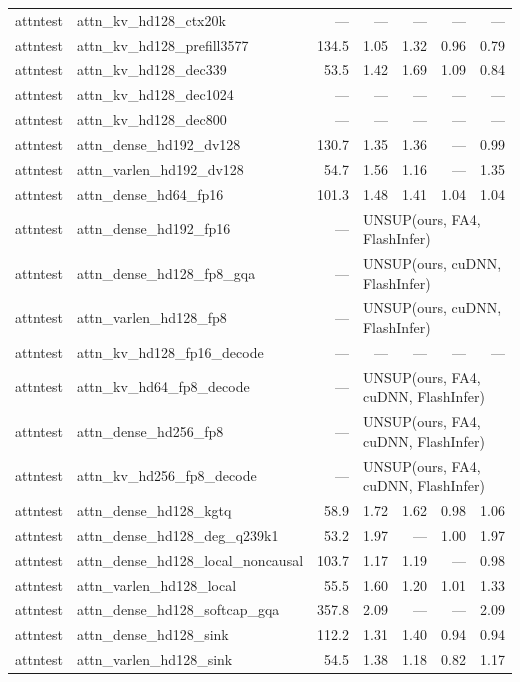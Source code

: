 \begin{longtable}{@{}llrrrrr@{}}
attntest & attn\_kv\_hd128\_ctx20k & --- & --- & --- & --- & --- \\
attntest & attn\_kv\_hd128\_prefill3577 & 134.5 & 1.05 & 1.32 & 0.96 & 0.79 \\
attntest & attn\_kv\_hd128\_dec339 & 53.5 & 1.42 & 1.69 & 1.09 & 0.84 \\
attntest & attn\_kv\_hd128\_dec1024 & --- & --- & --- & --- & --- \\
attntest & attn\_kv\_hd128\_dec800 & --- & --- & --- & --- & --- \\
attntest & attn\_dense\_hd192\_dv128 & 130.7 & 1.35 & 1.36 & --- & 0.99 \\
attntest & attn\_varlen\_hd192\_dv128 & 54.7 & 1.56 & 1.16 & --- & 1.35 \\
attntest & attn\_dense\_hd64\_fp16 & 101.3 & 1.48 & 1.41 & 1.04 & 1.04 \\
attntest & attn\_dense\_hd192\_fp16 & --- & \multicolumn{4}{l}{UNSUP({ours, FA4, FlashInfer})} \\
attntest & attn\_dense\_hd128\_fp8\_gqa & --- & \multicolumn{4}{l}{UNSUP({ours, cuDNN, FlashInfer})} \\
attntest & attn\_varlen\_hd128\_fp8 & --- & \multicolumn{4}{l}{UNSUP({ours, cuDNN, FlashInfer})} \\
attntest & attn\_kv\_hd128\_fp16\_decode & --- & --- & --- & --- & --- \\
attntest & attn\_kv\_hd64\_fp8\_decode & --- & \multicolumn{4}{l}{UNSUP({ours, FA4, cuDNN, FlashInfer})} \\
attntest & attn\_dense\_hd256\_fp8 & --- & \multicolumn{4}{l}{UNSUP({ours, FA4, cuDNN, FlashInfer})} \\
attntest & attn\_kv\_hd256\_fp8\_decode & --- & \multicolumn{4}{l}{UNSUP({ours, FA4, cuDNN, FlashInfer})} \\
attntest & attn\_dense\_hd128\_kgtq & 58.9 & 1.72 & 1.62 & 0.98 & 1.06 \\
attntest & attn\_dense\_hd128\_deg\_q239k1 & 53.2 & 1.97 & --- & 1.00 & 1.97 \\
attntest & attn\_dense\_hd128\_local\_noncausal & 103.7 & 1.17 & 1.19 & --- & 0.98 \\
attntest & attn\_varlen\_hd128\_local & 55.5 & 1.60 & 1.20 & 1.01 & 1.33 \\
attntest & attn\_dense\_hd128\_softcap\_gqa & 357.8 & 2.09 & --- & --- & 2.09 \\
attntest & attn\_dense\_hd128\_sink & 112.2 & 1.31 & 1.40 & 0.94 & 0.94 \\
attntest & attn\_varlen\_hd128\_sink & 54.5 & 1.38 & 1.18 & 0.82 & 1.17 \\

\end{longtable}
